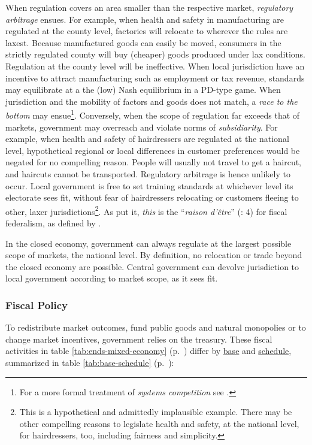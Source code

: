\begin{description}
	When regulation covers an area smaller than the respective market, \emph{regulatory arbitrage} ensues. For example, when health and safety in manufacturing are regulated at the county level, factories will relocate to wherever the rules are laxest. Because manufactured goods can easily be moved, consumers in the strictly regulated county will buy (cheaper) goods produced under lax conditions. Regulation at the county level will be ineffective. When local jurisdiction have an incentive to attract manufacturing such as employment or tax revenue, standards may equilibrate at a the (low) Nash equilibrium in a \gls{PD}-type game. When jurisdiction and the mobility of factors and goods does not match, a \emph{race to the bottom} may ensue\footnote{
		For a more formal treatment of \emph{systems competition} see \cite{Sinn2004}.}.
	Conversely, when the scope of regulation far exceeds that of markets, government may overreach and violate norms of \emph{subsidiarity}. For example, when health and safety of hairdressers are regulated at the national level, hypothetical regional or local differences in customer preferences would be negated for no compelling reason. People will usually not travel to get a haircut, and haircuts cannot be transported. Regulatory arbitrage is hence unlikely to occur. Local government is free to set training standards at whichever level its electorate sees fit, without fear of hairdressers relocating or customers fleeing to other, laxer jurisdictions\footnote{
		This is a hypothetical and admittedly implausible example. There may be other compelling reasons to legislate health and safety, at the national level, for hairdressers, too, including fairness and simplicity.}.
	As \citeauthor{Bordo2011} put it, \emph{this} is the ``\emph{raison d'\^{e}tre}'' (\citeyear{Bordo2011}: 4) for fiscal federalism, as defined by \cite{Oates1972}.

	In the closed economy, government can always regulate at the largest possible scope of markets, the national level. By definition, no relocation or trade beyond the closed economy are possible. Central government can devolve jurisdiction to local government according to market scope, as it sees fit.

\end{description}

\subsubsection[Fiscal Policy]{Fiscal Policy} \label{sec:fiscal}
To redistribute market outcomes, fund public goods and natural monopolies or to change market incentives, government relies on the treasury. These fiscal activities in table \ref{tab:ends-mixed-economy} (p.~\pageref{tab:ends-mixed-economy}) differ by \hyperref[it:base]{base} and \hyperref[it:schedule]{schedule}, summarized in table \ref{tab:base-schedule} (p.~\pageref{tab:base-schedule}):

